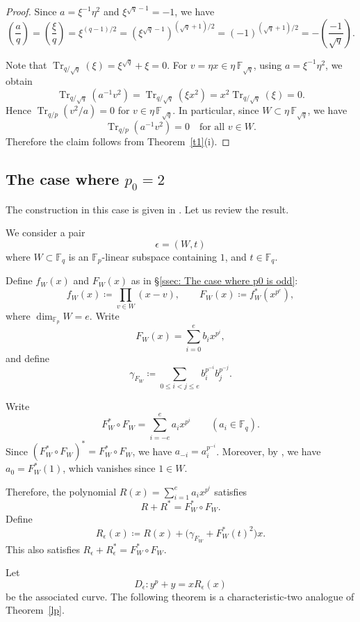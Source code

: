 \documentclass[12pt,a4paper]{amsart}
\theoremstyle{definition}
\def\F{{\mathbb F}}
\theoremstyle{remark}
\DeclareMathOperator{\Tr}{Tr}
\begin{document}
\begin{proof}
Since $a=\xi^{-1} \eta^2$ and $\xi^{\sqrt{q}-1}=-1$, we have
\[
\left(\frac{a}{q}\right)=\left(\frac{\xi}{q}\right)
=\xi^{(q-1)/2}
=(\xi^{\sqrt{q}-1})^{(\sqrt{q}+1)/2}
=(-1)^{(\sqrt{q}+1)/2}
=-\left(\frac{-1}{\sqrt{q}}\right).
\]

Note that $\Tr_{q/\sqrt{q}}(\xi)=\xi^{\sqrt{q}}+\xi=0$. 
For $v=\eta x \in \eta\, \F_{\sqrt{q}}$, using $a=\xi^{-1} \eta^2$, we obtain
\[
\Tr_{q/\sqrt{q}}(a^{-1}v^2)
=\Tr_{q/\sqrt{q}}(\xi x^2)
=x^2 \Tr_{q/\sqrt{q}}(\xi)
=0.
\]
Hence $\Tr_{q/p}(v^2/a)=0$ for 
$v \in \eta\, \F_{\sqrt{q}}$. 
In particular, since $W \subset \eta\, \F_{\sqrt{q}}$, we have
\[
\Tr_{q/p}(a^{-1}v^2)=0 
\quad \text{for all } v \in W.
\]
Therefore the claim follows from Theorem~\ref{t1}(i).
\end{proof}

\subsection{The case where $p_0=2$}
The construction in this case is given in \cite{ITT1}. Let us review the result. 

We consider a pair 
\[
\epsilon=(W,t)
\]
where $W\subset \F_q$ is an $\F_p$-linear subspace containing $1$, and $t\in\F_q$. 

Define $f_W(x)$ and $F_W(x)$ as in \S\ref{ssec: The case where p0 is odd}: 
\[
f_W(x)\coloneqq\prod_{v\in W}(x-v),\qquad 
F_W(x)\coloneqq f_W^\ast(x^{p^e}), 
\]
where $\dim_{\F_p}W=e$. Write 
\[
F_W(x)=\sum_{i=0}^eb_ix^{p^i}, 
\]
and define 
\[
\gamma_{F_W}\coloneqq\sum_{0\le i<j\le e}b_i^{p^{-i}}b_j^{p^{-j}}. 
\]

Write 
\[
F_W^\ast\circ F_W=\sum_{i=-e}^ea_ix^{p^i}\qquad(a_i\in\F_q). 
\]
Since $(F_W^\ast\circ F_W)^\ast=F_W^\ast\circ F_W$, we have $a_{-i}=a_i^{p^{-i}}$. Moreover, by \cite[Corollary~2.10]{ITT1}, we have $a_0=F_W^\ast(1)$, which vanishes since $1\in W$. 

Therefore, the polynomial 
$R(x)=\sum_{i=1}^ea_ix^{p^i}$ satisfies 
\[
R+R^\ast=F_W^\ast\circ F_W. 
\]
Define 
\[
R_\epsilon(x)\coloneqq R(x)+\bigl(\gamma_{F_W}+F_W^\ast(t)^2\bigr)x. 
\]
This also satisfies $R_\epsilon+R_\epsilon^\ast=F_W^\ast\circ F_W$. 

Let 
\[
D_\epsilon: y^p+y=xR_{\epsilon}(x) 
\]
be the associated curve. 
The following theorem is a characteristic-two analogue of Theorem~\ref{lp}. 
\end{document}
